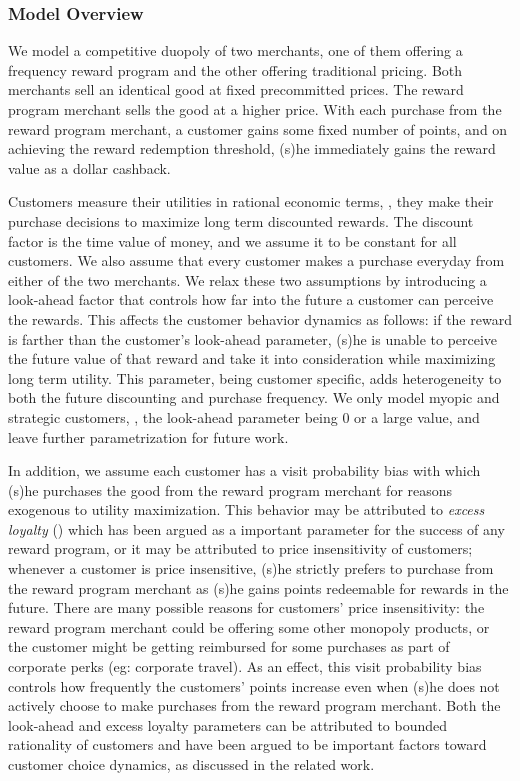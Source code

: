 \subsubsection{Model Overview}
We model a competitive duopoly of two merchants, one of them offering a frequency reward program and the other offering traditional pricing.
Both merchants sell an identical good at fixed precommitted prices.
The reward program merchant sells the good at a higher price.
With each purchase from the reward program merchant, a customer gains some fixed number of points, and on achieving the reward redemption threshold, (s)he immediately gains the reward value as a dollar cashback.

Customers measure their utilities in rational economic terms, \ie, they make their purchase decisions to maximize long term discounted rewards.
The discount factor is the time value of money, and we assume it to be constant for all customers.
We also assume that every customer makes a purchase everyday from either of the two merchants.
We relax these two assumptions by introducing a look-ahead factor that controls how far into the future a customer can perceive the rewards. 
This affects the customer behavior dynamics as follows: if the reward is farther than the customer's look-ahead parameter, (s)he is unable to perceive the future value of that reward and take it into consideration while maximizing long term utility.
This parameter, being customer specific, adds heterogeneity to both the future discounting and purchase frequency.
We only model myopic and strategic customers, \ie, the look-ahead parameter being $0$ or a large value, and leave further parametrization for future work.

In addition, we assume each customer has a visit probability bias with which (s)he purchases the good from the reward program merchant for reasons exogenous to utility maximization.
This behavior may be attributed to \emph{excess loyalty} (\cite{fader1993excess, sharp1997loyalty}) which has been argued as a important parameter for the success of any reward program, or it may be attributed to price insensitivity of customers; whenever a customer is price insensitive, (s)he strictly prefers to purchase from the reward program merchant as (s)he gains points redeemable for rewards in the future.
There are many possible reasons for customers' price insensitivity: the reward program merchant could be offering some other monopoly products, or the customer might be getting reimbursed for some purchases as part of corporate perks (eg: corporate travel).
As an effect, this visit probability bias controls how frequently the customers' points increase even when (s)he does not actively choose to make purchases from the reward program merchant.
Both the look-ahead and excess loyalty parameters can be attributed to bounded rationality of customers and have been argued to be important factors toward customer choice dynamics, as discussed in the related work.


